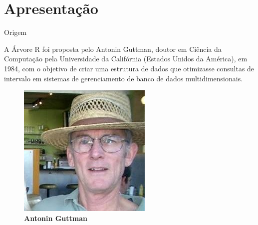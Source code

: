 \documentclass[compress,aspectratio=169]{beamer}
\subtitle[Árvore R]  {Seminário: Árvore R (R-Tree)}
\begin{document}
\begindocument

\section{Apresentação}

\begin{frame}{Origem}
\begin{justify}
A Árvore R foi proposta pelo Antonin Guttman, doutor em Ciência da Computação pela Universidade da Califórnia (Estados Unidos da América), em 1984, com o objetivo de criar uma estrutura de dados que otimizasse consultas de intervalo em sistemas de gerenciamento de banco de dados multidimensionais. 
 \begin{figure}[] 
        \centering
        \includegraphics[width=0.25\linewidth]{1516279730868.jpeg}
        \caption{\textbf{Antonin Guttman}}
        \label{fig:enter-label}
  
\end{figure}  

\end{justify}

\end{frame}
\end{document}
